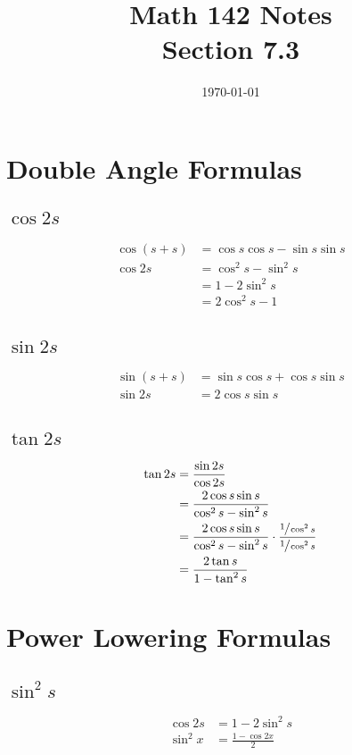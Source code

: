 \documentclass{exam}
\title{Math 142 Notes \\ Section 7.3}
\date{\today}
\begin{document}
  \maketitle
  \tableofcontents

  \section{Double Angle Formulas}

  \subsection{$\cos 2s$}
  \begin{align*}
    \cos(s + s) & = \cos s \cos s - \sin s \sin s \\
    \cos 2s     & = \cos^2 s - \sin^2 s \\
                & = 1 - 2 \sin^2 s \\
                & = 2 \cos^2 s - 1 \\
  \end{align*}

  \subsection{$\sin 2s$}
  \begin{align*}
    \sin(s + s) & = \sin s \cos s + \cos s \sin s \\
    \sin 2s     & = 2 \cos s \sin s \\
  \end{align*}

  \subsection{$\tan 2s$}
  \begin{align*}
    \tan 2s & = \frac{\sin 2s}{\cos 2s} \\
            & = \frac{2 \cos s \sin s}{\cos^2 s - \sin^2 s} \\
            & = \frac{2 \cos s \sin s}{\cos^2 s - \sin^2 s} \cdot \frac{\sfrac{1}{\cos^2 s}}{\sfrac{1}{\cos^2 s}} \\
            & = \frac{2 \tan s}{1 - \tan^2 s} \\
  \end{align*}

  \section{Power Lowering Formulas}

  \subsection{$\sin^2 s$}
  \begin{align*}
    \cos 2s  & = 1 - 2 \sin^2 s \\
    \sin^2 x & = \frac{1 - \cos 2x}{2} \\
  \end{align*}
\end{document}
